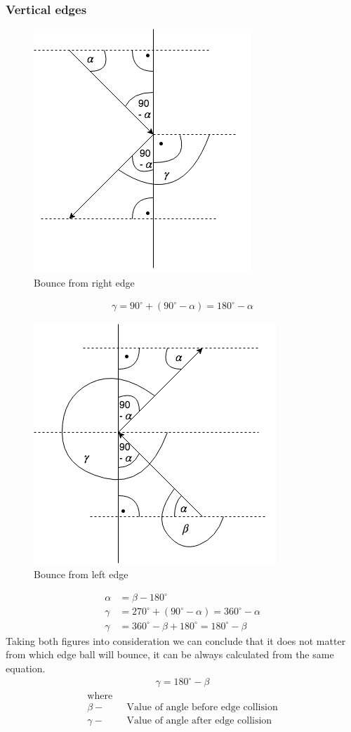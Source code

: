 \documentclass[]{report}
\begin{document}
\subsubsection{Vertical edges}
\begin{figure}[H]
	\centering
	\includegraphics[height=0.4\linewidth]{rightEdge}
	\caption{Bounce from right edge}
	\label{fig:right_edge}
	\end{figure}
	\begin{equation}
\begin{aligned}
\label{eq:right_edge}
\gamma = 90^{\circ} + (90^{\circ} - \alpha) = 180^{\circ} - \alpha
\end{aligned}
\end{equation}
\begin{figure}[H]
	\centering
	\includegraphics[height=0.4\linewidth]{leftEdge}
	\caption{Bounce from left edge}
	\label{fig:left_edge}
\end{figure}
\begin{equation}
\begin{aligned}
\label{eq:left_edge}
\alpha & = \beta - 180^{\circ}\\
\gamma & = 270^{\circ}+(90^{\circ}-\alpha) = 360^{\circ} - \alpha \\
\gamma & = 360^{\circ} - \beta + 180^{\circ} = 180^{\circ} - \beta
\end{aligned}
\end{equation}
Taking both figures into consideration we can conclude that it does not matter from which edge ball will bounce, it can be always calculated from the same equation.
\begin{equation}
\begin{aligned}
\label{eq:vertical_edge}
\gamma = 180^{\circ} - \beta
\end{aligned}
\end{equation}
\begin{align*}
\text{where} \\
\beta -& \text{~~Value of angle before edge collision} \\
\gamma -& \text{~~Value of angle after edge collision}
\end{align*}
\end{document}
